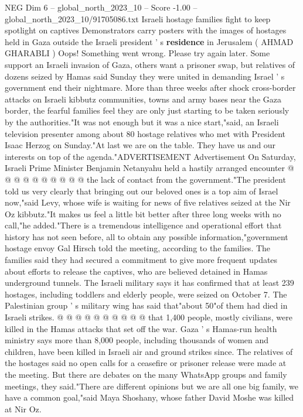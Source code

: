 \begin{textsample}{NEG Dim 6 – global\_north\_2023\_10 – Score -1.00 – global\_north\_2023\_10/91705086.txt}  \label{ex:f6_neg_254}
Israeli hostage families fight to keep spotlight on captives Demonstrators carry posters with the images of hostages held in Gaza outside the Israeli president ' s \textbf{residence} in Jerusalem ( AHMAD GHARABLI ) Oops!
Something went wrong.
Please try again later.
Some support an Israeli invasion of Gaza, others want a prisoner swap, but relatives of dozens seized by Hamas said Sunday they were united in demanding Israel ' s government end their nightmare.
More than three weeks after shock cross-border attacks on Israeli kibbutz communities, towns and army bases near the Gaza border, the fearful families feel they are only just starting to be taken seriously by the authorities."It was not enough but it was a nice start,"said, an Israeli television presenter among about 80 hostage relatives who met with President Isaac Herzog on Sunday."At last we are on the table.
They have us and our interests on top of the agenda."ADVERTISEMENT Advertisement On Saturday, Israeli Prime Minister Benjamin Netanyahu held a hastily arranged encounter @ @ @ @ @ @ @ @ @ @ the lack of contact from the government."The president told us very clearly that bringing out our beloved ones is a top aim of Israel now,"said Levy, whose wife is waiting for news of five relatives seized at the Nir Oz kibbutz."It makes us feel a little bit better after three long weeks with no call,"he added."There is a tremendous intelligence and operational effort that history has not seen before, all to obtain any possible information,"government hostage envoy Gal Hirsch told the meeting, according to the families.
The families said they had secured a commitment to give more frequent updates about efforts to release the captives, who are believed detained in Hamas underground tunnels.
The Israeli military says it has confirmed that at least 239 hostages, including toddlers and elderly people, were seized on October 7.
The Palestinian group ' s military wing has said that"about 50"of them had died in Israeli strikes. @ @ @ @ @ @ @ @ @ @ that 1,400 people, mostly civilians, were killed in the Hamas attacks that set off the war.
Gaza ' s Hamas-run health ministry says more than 8,000 people, including thousands of women and children, have been killed in Israeli air and ground strikes since.
The relatives of the hostages said no open calls for a ceasefire or prisoner release were made at the meeting.
But there are debates on the many WhatsApp groups and family meetings, they said."There are different opinions but we are all one big family, we have a common goal,"said Maya Shoshany, whose father David Moshe was killed at Nir Oz.

\end{textsample}
